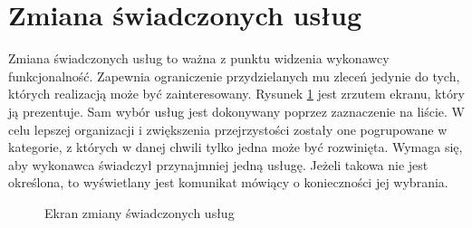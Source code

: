 \section{Zmiana świadczonych usług}

Zmiana świadczonych usług to ważna z punktu widzenia wykonawcy funkcjonalność. Zapewnia ograniczenie przydzielanych mu zleceń jedynie do tych, których realizacją może być zainteresowany. Rysunek \ref{fig:services} jest zrzutem ekranu, który ją prezentuje.
Sam wybór usług jest dokonywany poprzez zaznaczenie na liście. W celu lepszej organizacji i zwiększenia przejrzystości zostały one pogrupowane w kategorie, z których w danej chwili tylko jedna może być rozwinięta. Wymaga się, aby wykonawca świadczył przynajmniej jedną usługę. Jeżeli takowa nie jest określona, to wyświetlany jest komunikat mówiący o konieczności jej wybrania.

\begin{figure}[ht!]
  \centering
  \caption{Ekran zmiany świadczonych usług}
  \label{fig:services}
\end{figure}
